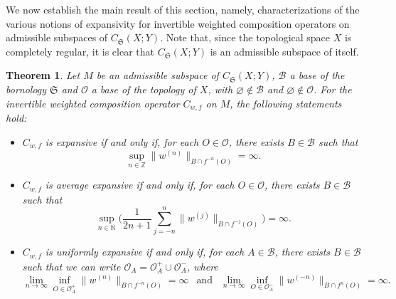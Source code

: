 \documentclass[12pt]{article}
\theoremstyle{plain}
\newtheorem{theorem}{Theorem}%
\theoremstyle{definition}
\newcommand{\N}{\mathbb{N}} %
\newcommand{\Z}{\mathbb{Z}} %
\newcommand{\cB}{\mathcal{B}}
\newcommand{\cO}{\mathcal{O}}
\newcommand{\fS}{\mathfrak{S}}
\begin{document}
We now establish the main result of this section, namely, characterizations of the various notions of expansivity 
for invertible weighted composition operators on admissible subspaces of $C_\fS(X;Y)$.
Note that, since the topological space $X$ is completely regular, it is clear that $C_\fS(X;Y)$ is an admissible subspace of itself.

\begin{theorem}\label{ExpCX-T1}
Let $M$ be an admissible subspace of $C_\fS(X;Y)$, $\cB$ a base of the bornology $\fS$ and $\cO$ a base of the topology of $X$,
with $\varnothing \not\in \cB$ and $\varnothing \not\in \cO$. 
For the invertible weighted composition operator $C_{w,f}$ on $M$, the following statements hold:
\begin{itemize}
\item [\rm (a)] $C_{w,f}$ is expansive if and only if, for each $O \in \cO$, there exists $B \in \cB$ such that
    \[
    \sup_{n \in \Z} \|w^{(n)}\|_{B \cap f^{-n}(O)} = \infty.
    \]
\item [\rm (b)] $C_{w,f}$ is average expansive if and only if, for each $O \in \cO$, there exists $B \in \cB$ such that
    \[
    \sup_{n \in \N} \Big(\frac{1}{2n+1} \sum_{j=-n}^n \|w^{(j)}\|_{B \cap f^{-j}(O)}\Big) = \infty.
    \]
\item [\rm (c)] $C_{w,f}$ is uniformly expansive if and only if, for each $A \in \cB$,
    there exists $B \in \cB$ such that we can write $\cO_A = \cO_A^+ \cup \cO_A^-$, where
    \[
    \lim_{n \to \infty} \inf_{O \in \cO_A^+} \|w^{(n)}\|_{B\cap f^{-n}(O)} = \infty \ \ \text{ and } \ \ 
    \lim_{n \to \infty} \inf_{O \in \cO_A^-} \|w^{(-n)}\|_{B\cap f^{n}(O)} = \infty.
    \]
\end{itemize}
\end{theorem}
\end{document}
